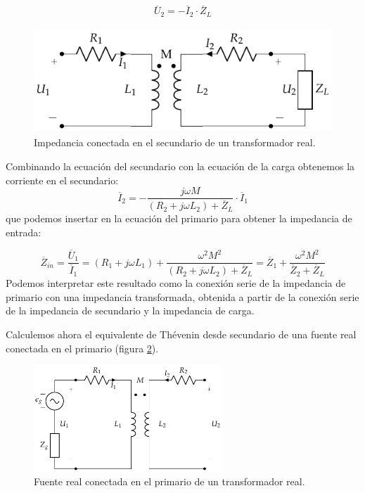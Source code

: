 \begin{equation*}
  \overline{U}_2 = - \overline{I}_2 \cdot \overline{Z}_L
\end{equation*}

\begin{figure}
  \centering
  \includegraphics[height=4cm]{../figs/Trafo_Real_ImpSec.pdf}
  \caption{Impedancia conectada en el secundario de un transformador
    real.}
  \label{fig:trafo-real-impedancia-secundario}
\end{figure}


Combinando la ecuación del secundario con la ecuación de la carga
obtenemos la corriente en el secundario:
\[
  \overline{I}_2 = - \frac{j \omega M}{(R_2 + j \omega L_2) +
    \overline{Z}_L} \cdot \overline{I}_1
\]
que podemos insertar en la ecuación del primario para obtener la
impedancia de entrada:

\begin{equation}
  \label{eq:trafo-real-impedancia-entrada}
  \overline{Z}_{in}  = \frac{\overline{U}_1}{\overline{I}_1} =  (R_1 + j \omega L_1) + \frac{\omega^2 M^2}{(R_2 + j \omega L_2) + \overline{Z}_L} = \boxed{\overline{Z}_1 + \frac{\omega^2 M^2}{\overline{Z}_2 + \overline{Z}_L}}
\end{equation}
Podemos interpretar este resultado como la conexión serie de la
impedancia de primario con una impedancia transformada, obtenida a
partir de la conexión serie de la impedancia de secundario y la
impedancia de carga.

Calculemos ahora el equivalente de Thévenin desde secundario de una
fuente real conectada en el primario (figura
\ref{fig:trafo-real-fuente-primario}).

\begin{figure}
  \centering
  \includegraphics[height=4cm]{../figs/Trafo_Real_FuentePrimario.pdf}
  \caption{Fuente real conectada en el primario de un transformador
    real.}
  \label{fig:trafo-real-fuente-primario}
\end{figure}

